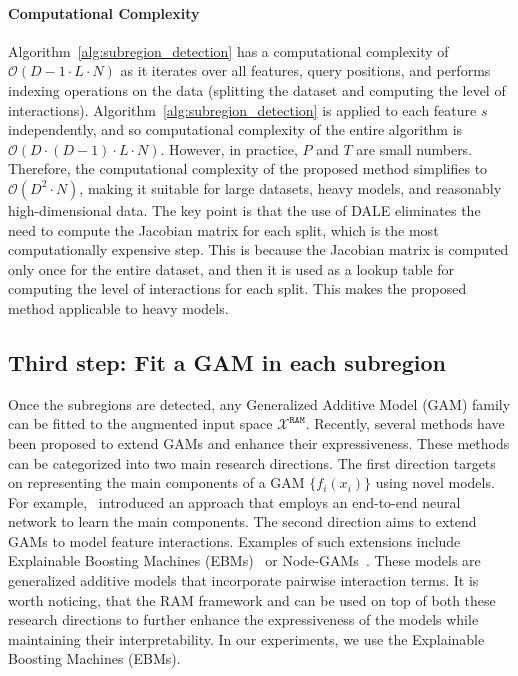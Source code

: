 \documentclass[12pt]{article}
\begin{document}
\paragraph{Computational Complexity}


Algorithm~\ref{alg:subregion_detection} has a computational complexity of $\mathcal{O}(D-1 \cdot L \cdot N)$
as it iterates over all features, query positions, and performs indexing operations on the data (splitting the dataset and computing the level of interactions).
Algorithm~\ref{alg:subregion_detection} is applied to each feature $s$ independently, and so computational complexity of the entire algorithm is $\mathcal{O}(D \cdot (D-1) \cdot L \cdot N)$.
However, in practice, $P$ and $T$ are small numbers.
Therefore, the computational complexity of the proposed method simplifies to $\mathcal{O}(D^2 \cdot N)$,
making it suitable for large datasets, heavy models, and reasonably high-dimensional data.
The key point is that the use of DALE eliminates the need to compute the Jacobian matrix for each split,
which is the most computationally expensive step.
This is because the Jacobian matrix is computed only once for the entire dataset, and then it is used as a lookup table for computing the level of interactions for each split.
This makes the proposed method applicable to heavy models.

\subsection{Third step: Fit a GAM in each subregion}
\label{subsec:fitting_gams}

Once the subregions are detected, any Generalized Additive Model (GAM) family can be fitted to the augmented input space $\mathcal{X}^{\mathtt{RAM}}$.
Recently, several methods have been proposed to extend GAMs and enhance their expressiveness.
These methods can be categorized into two main research directions.
The first direction targets on representing the main components of a GAM $\{ f_i(x_i) \}$ using novel models.
For example,~\citep{agarwal2021neural} introduced an approach that employs an end-to-end neural network to learn the main components.
The second direction aims to extend GAMs to model feature interactions.
Examples of such extensions include Explainable Boosting Machines (EBMs)~\citep{lou2013accurate} or
Node-GAMs~\citep{chang2021node}.
These models are generalized additive models that incorporate pairwise interaction terms.
It is worth noticing, that the RAM framework and can be used on top of both these research directions
to further enhance the expressiveness of the models while maintaining their interpretability.
In our experiments, we use the Explainable Boosting Machines (EBMs).
\end{document}
